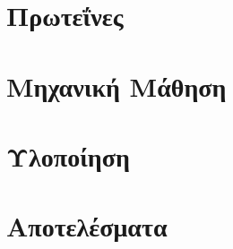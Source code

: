 \documentclass[a4paper,11pt,oneside]{book}
\author{\me}
\begin{document}
\setcounter{page}{3}


\clearemptydoublepage


\clearemptydoublepage


\clearemptydoublepage



\clearemptydoublepage



\clearemptydoublepage

\pagestyle{fancy}

\tableofcontents
\listoffigures
\listoftables
\clearemptydoublepage

\setcounter{page}{1}


\clearemptydoublepage

\chapter{Πρωτεΐνες}\label{ch:chap1}



\chapter{Μηχανική Μάθηση}\label{ch:chap2}

\clearemptysinglepage

\chapter{Υλοποίηση}\label{ch:chap3}

\clearemptydoublepage

\chapter{Αποτελέσματα}\label{ch:chap4}

\clearemptysinglepage



\clearemptysinglepage


\end{document}
